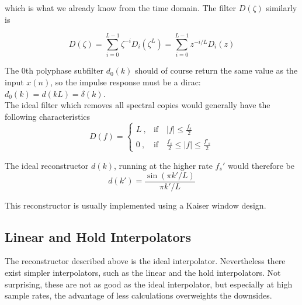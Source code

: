which is what we already know from the time domain. The filter $D(\zeta)$
similarly is

\begin{equation*}
	D(\zeta) = \sum\limits_{i=0}^{L-1} \zeta^{-i} D_i(\zeta^L)
	= \sum\limits_{i=0}^{L-1} z^{-i/L} D_i(z)
\end{equation*}

The 0th polyphase subfilter $d_0(k)$ should of course return the same value as
the input $x(n)$, so the impulse response must be a dirac: 
$d_0(k) = d(kL) = \delta(k)$. \\

The ideal filter which removes all spectral copies would generally have 
the following characteristics
\begin{equation*}
	D(f) = \begin{cases}
		L\:,	& \text{if} \quad |f|\leq\frac{f_s}{2} \\
		0\:,	& \text{if} \quad \frac{f_s}{2}\leq |f|\leq\frac{f'_s}{2}
	\end{cases}
\end{equation*}

The ideal reconstructor $d(k)$, running at the higher rate $f_s'$ would
therefore be
\begin{equation*}
	d(k') = \frac{\sin(\pi k' / L)}{\pi k' / L}
\end{equation*}

This reconstructor is usually implemented using a Kaiser window design. 

\subsection{Linear and Hold Interpolators}
The reconstructor described above is the ideal interpolator. Nevertheless
there exist simpler interpolators, such as the linear and the hold interpolators.
Not surprising, these are not as good as the ideal interpolator, but especially
at high sample rates, the advantage of less calculations overweights the
downsides.

